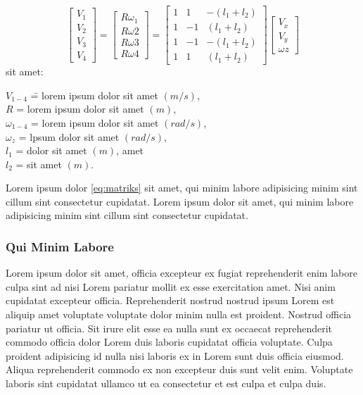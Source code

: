 \begin{equation}
	\begin{bmatrix}V_{1}\\V_{2}\\V_{3}\\V_{4}\end{bmatrix} = \begin{bmatrix}R \omega _{1}\\R \omega{2}\\R \omega{3}\\R \omega{4}\end{bmatrix} = \begin{bmatrix}1&1&-(l_1+l_2)\\1&-1&(l_1+l_2)\\1&-1&-(l_1+l_2)\\1&1&(l_1+l_2)\end{bmatrix}  \begin{bmatrix}V_{x}\\V_{y}\\\omega{z}\end{bmatrix}
	\label{eq:matriks}
\end{equation}
\begingroup
\setlength{\parindent}{0pt}
\setlength{\parskip}{0cm}
sit amet:
\begin{tabbing}
	$ V_{1-4} $\hspace{0.3cm} 	\= = lorem ipsum dolor sit amet $ (m/s) $,\\
	$ R $						\> = lorem ipsum dolor sit amet $ (m) $,\\
	$ \omega_{1-4} $			\> = lorem ipsum dolor sit amet $ (rad/s) $,\\
	$ \omega_{z} $				\> = lpsum dolor sit amet $ (rad/s) $,\\
	$ l_{1} $					\> = dolor sit amet $ (m) $, amet\\
	$ l_{2} $					\> = sit amet $ (m) $.
\end{tabbing}
\endgroup
Lorem ipsum dolor \ref{eq:matriks} sit amet, qui minim labore adipisicing minim sint cillum sint consectetur cupidatat. Lorem ipsum dolor sit amet, qui minim labore adipisicing minim sint cillum sint consectetur cupidatat.

\subsubsection{Qui Minim Labore}
Lorem ipsum dolor sit amet, officia excepteur ex fugiat reprehenderit enim labore culpa sint ad nisi Lorem pariatur mollit ex esse exercitation amet. Nisi anim cupidatat excepteur officia. Reprehenderit nostrud nostrud ipsum Lorem est aliquip amet voluptate voluptate dolor minim nulla est proident. Nostrud officia pariatur ut officia. Sit irure elit esse ea nulla sunt ex occaecat reprehenderit commodo officia dolor Lorem duis laboris cupidatat officia voluptate. Culpa proident adipisicing id nulla nisi laboris ex in Lorem sunt duis officia eiusmod. Aliqua reprehenderit commodo ex non excepteur duis sunt velit enim. Voluptate laboris sint cupidatat ullamco ut ea consectetur et est culpa et culpa duis.

